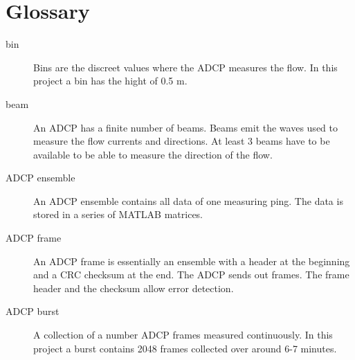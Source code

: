 \chapter*{Glossary}


\begin{description}
  \item[bin] Bins are the discreet values where the ADCP measures the flow. In this project a bin has the hight of 0.5 m.
  \item[beam] An ADCP has a finite number of beams. Beams emit the waves used to measure the flow currents and directions. At least 3 beams have to be available to be able to measure the direction of the flow.
  \item[ADCP ensemble] An ADCP ensemble contains all data of one measuring ping. The data is stored in a series of MATLAB matrices.
  \item[ADCP frame] An ADCP frame is essentially an ensemble with a header at the beginning and a CRC checksum at the end. The ADCP sends out frames. The frame header and the checksum allow error detection.
  \item[ADCP burst] A collection of a number ADCP frames measured continuously. In this project a burst contains 2048 frames collected over around 6-7 minutes.

\end{description}
